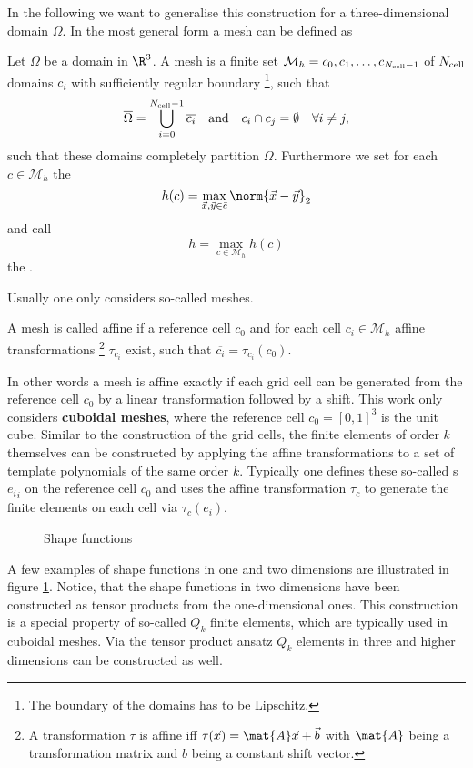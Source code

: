In the following we want to generalise this construction
for a three-dimensional domain $\Omega$.
In the most general form a mesh can be defined as
\begin{defn}[Mesh]
	Let $\Omega$ be a domain in $\R^3$.
	A mesh is a finite set $\mathcal{M}_h = {c_0, c_1, \ldots, c_{N_\text{cell}-1}}$
	of $N_\text{cell}$ domains $c_i$ with sufficiently regular boundary%
	\footnote{The boundary of the domains has to be Lipschitz.},
	such that
	\begin{align*}
		\overline{\Omega} &= \bigcup_{i=0}^{N_\text{cell}-1} \overline{c_i}
		&&\text{and}
		&c_i \cap c_j = \emptyset \quad \forall i \neq j,
	\end{align*}
	\ie such that these domains completely partition $\Omega$.
	Furthermore we set for each $c \in \mathcal{M}_h$
	the 
	\[ h(c) = \max_{\vec{x},\vec{y} \in \bar{c}} \norm{\vec{x}-\vec{y}}_2 \]
	and call
	\[ h = \max_{c \in \mathcal{M}_h} h(c) \]
	the .
\end{defn}
\noindent
Usually one only considers so-called  meshes.
\begin{defn}
	A mesh is called affine if a reference cell $c_0$
	and for each cell $c_i \in \mathcal{M}_h$
	affine transformations%
	\footnote{A transformation $\tau$ is affine iff $\tau(\vec{x}) = \mat{A}\vec{x} + \vec{b}$ with $\mat{A}$ being a transformation matrix and $b$ being a constant shift vector.}
	$\tau_{c_i}$ exist,
	such that $\overline{c_i} = \tau_{c_i}(c_0)$.
\end{defn}
In other words a mesh is affine exactly if each
grid cell can be generated from the reference cell $c_0$
by a linear transformation followed by a shift.
This work only considers \textbf{cuboidal meshes},
where the reference cell $c_0 = [0,1]^3$ is the unit cube.
Similar to the construction of the grid cells,
the finite elements of order $k$ themselves
can be constructed by applying the affine transformations
to a set of template polynomials of the same order $k$.
Typically one defines these so-called
s ${e_i}_i$
on the reference cell $c_0$
and uses the affine transformation $\tau_c$
to generate the finite elements on each cell
via $\tau_c(e_i)$.
%
\begin{figure}
	\centering
	\caption{Shape functions}
	\label{fig:ShapeFunctions}
\end{figure}
%
A few examples of shape functions in one and two dimensions are illustrated
in figure \ref{fig:ShapeFunctions}.
Notice, that the shape functions in two dimensions
have been constructed as tensor products from the one-dimensional ones.
This construction is a special property of so-called $Q_k$ finite elements,
which are typically used in cuboidal meshes.
Via the tensor product ansatz $Q_k$ elements
in three and higher dimensions can be constructed as well.


